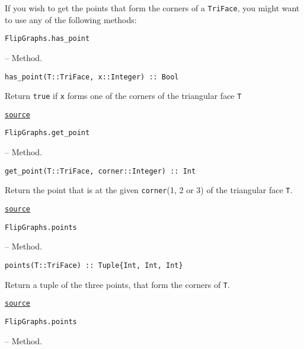 If you wish to get the points that form the corners of a \texttt{TriFace}, you might want to use any of the following methods:


\hypertarget{299338672099245860}{\texttt{FlipGraphs.has\_point}}  -- {Method.}

\begin{adjustwidth}{2em}{0pt}


\begin{verbatim}
has_point(T::TriFace, x::Integer) :: Bool
\end{verbatim}

Return \texttt{true} if \texttt{x} forms one of the corners of the triangular face \texttt{T}



\href{https://github.com/schto223/FlipGraphs.jl/blob/490c01a7adf74b42f27dda05099165c47ae8133e/src/deltaComplex.jl#L182-L187}{\texttt{source}}


\end{adjustwidth}
\hypertarget{11409664667544908067}{\texttt{FlipGraphs.get\_point}}  -- {Method.}

\begin{adjustwidth}{2em}{0pt}


\begin{verbatim}
get_point(T::TriFace, corner::Integer) :: Int
\end{verbatim}

Return the point that is at the given \texttt{corner}(1, 2 or 3) of the triangular face \texttt{T}.



\href{https://github.com/schto223/FlipGraphs.jl/blob/490c01a7adf74b42f27dda05099165c47ae8133e/src/deltaComplex.jl#L197-L201}{\texttt{source}}


\end{adjustwidth}
\hypertarget{15026073979390803683}{\texttt{FlipGraphs.points}}  -- {Method.}

\begin{adjustwidth}{2em}{0pt}


\begin{verbatim}
points(T::TriFace) :: Tuple{Int, Int, Int}
\end{verbatim}

Return a tuple of the three points, that form the corners of \texttt{T}.



\href{https://github.com/schto223/FlipGraphs.jl/blob/490c01a7adf74b42f27dda05099165c47ae8133e/src/deltaComplex.jl#L190-L194}{\texttt{source}}


\end{adjustwidth}
\hypertarget{15096165755102203171}{\texttt{FlipGraphs.points}}  -- {Method.}

